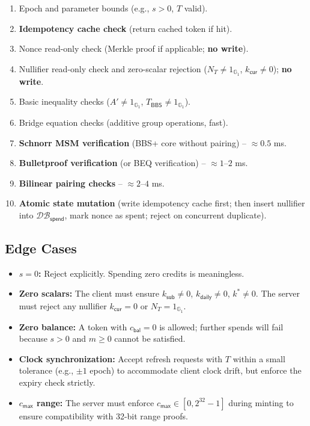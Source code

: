 \documentclass[11pt]{article}
\theoremstyle{definitionstyle}
\theoremstyle{plain}
\newcommand{\DB}{\mathcal{DB}}
\begin{document}
\begin{enumerate}[leftmargin=*]
\item Epoch and parameter bounds (e.g., $s > 0$, $T$ valid).
\item \textbf{Idempotency cache check} (return cached token if hit).
\item Nonce read-only check (Merkle proof if applicable; \textbf{no write}).
\item Nullifier read-only check and zero-scalar rejection ($N_T \neq 1_{\mathbb{G}_1}$, $k_{\mathsf{cur}} \neq 0$); \textbf{no write}.
\item Basic inequality checks ($A' \neq 1_{\mathbb{G}_1}$, $T_{\mathsf{BBS}} \neq 1_{\mathbb{G}_1}$).
\item Bridge equation checks (additive group operations, fast).
\item \textbf{Schnorr MSM verification} (BBS+ core without pairing) – $\approx 0.5$ ms.
\item \textbf{Bulletproof verification} (or BEQ verification) – $\approx 1$--$2$ ms.
\item \textbf{Bilinear pairing checks} – $\approx 2$--$4$ ms.
\item \textbf{Atomic state mutation} (write idempotency cache first; then insert nullifier into $\DB_{\mathsf{spend}}$, mark nonce as spent; reject on concurrent duplicate).
\end{enumerate}

\subsection{Edge Cases}

\begin{itemize}[leftmargin=*]
\item \textbf{$s = 0$:} Reject explicitly. Spending zero credits is meaningless.
\item \textbf{Zero scalars:} The client must ensure $k_{\mathsf{sub}} \neq 0$, $k_{\mathsf{daily}} \neq 0$, $k^* \neq 0$. The server must reject any nullifier $k_{\mathsf{cur}} = 0$ or $N_T = 1_{\mathbb{G}_1}$.
\item \textbf{Zero balance:} A token with $c_{\mathsf{bal}} = 0$ is allowed; further spends will fail because $s > 0$ and $m \ge 0$ cannot be satisfied.
\item \textbf{Clock synchronization:} Accept refresh requests with $T$ within a small tolerance (e.g., $\pm 1$ epoch) to accommodate client clock drift, but enforce the expiry check strictly.
\item \textbf{$c_{\mathsf{max}}$ range:} The server must enforce $c_{\mathsf{max}} \in [0, 2^{32}-1]$ during minting to ensure compatibility with 32-bit range proofs.
\end{itemize}
\end{document}
